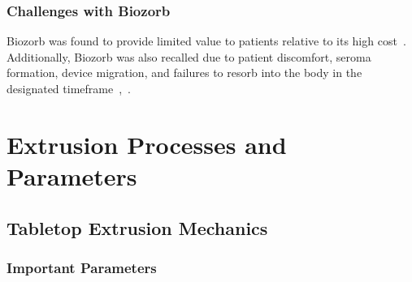 \subsubsection{Challenges with Biozorb\label{sec:literatureReview:currentMethods:challengeswithcurrentdevicesandmethods:biozorb}}
Biozorb was found to provide limited value to patients relative to its high cost~\cite{RefWorks:RefID:344-mitchell2019adaptable}. Additionally, Biozorb was also recalled due to patient discomfort, seroma formation, device migration, and failures to resorb into the body in the designated timeframe~\cite{RefWorks:RefID:296-2024hologic},~\cite{RefWorks:RefID:28-nudelunited}.


\section{Extrusion Processes and Parameters\label{sec:literatureReview:extrusion}}

\subsection{Tabletop Extrusion Mechanics\label{sec:literatureReview:extrusion:mechanics}}

\subsubsection{Important Parameters\label{sec:literatureReview:extrusion:mechanics:parameters}}


